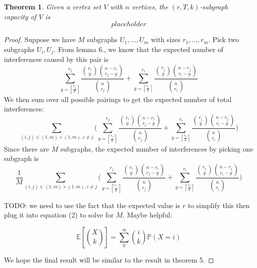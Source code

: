 \documentclass[10pt]{extarticle}
\newcommand{\E}{\mathbb{E}}
\newtheorem{theorem}{Theorem}
\theoremstyle{definition}
\begin{document}
\begin{theorem}
    Given a vertex set $V$ with $n$ vertices, the $(r,T,k)$-subgraph capacity of $V$ is 
    \begin{equation*}
        placeholder
    \end{equation*}
\end{theorem}

\begin{proof}
    Suppose we have $M$ subgraphs $U_1,...,U_m$ with sizes $r_1,...,r_m$. Pick two subgraphs $U_i,U_j$. From lemma 6., we know that the expected number of interferences caused by this pair is
    $$
    \sum_{y = \left\lceil \frac{r_j}{k} \right\rceil}^{r_j}  \frac{\binom{r_i}{y} \binom{n-r_i}{r_j-y}}{\binom{n}{r_j}} + \sum_{y = \left\lceil \frac{r_i}{k} \right\rceil}^{r_i}  \frac{\binom{r_j}{y} \binom{n-r_j}{r_i-y}}{\binom{n}{r_i}}
    $$
    We then sum over all possible pairings to get the expected number of total interferences:
    $$
    \sum_{(i,j) \in (1,m)\times(1,m), i \ne j} \Biggl( \sum_{y = \left\lceil \frac{r_j}{k} \right\rceil}^{r_j}  \frac{\binom{r_i}{y} \binom{n-r_i}{r_j-y}}{\binom{n}{r_j}} + \sum_{y = \left\lceil \frac{r_i}{k} \right\rceil}^{r_i}  \frac{\binom{r_j}{y} \binom{n-r_j}{r_i-y}}{\binom{n}{r_i}} \Biggr)
    $$
    Since there are $M$ subgraphs, the expected number of interferences by picking one subgraph is
    $$
    \frac{1}{M} \sum_{(i,j) \in (1,m)\times(1,m), i \ne j} \Biggl( \sum_{y = \left\lceil \frac{r_j}{k} \right\rceil}^{r_j}  \frac{\binom{r_i}{y} \binom{n-r_i}{r_j-y}}{\binom{n}{r_j}} + \sum_{y = \left\lceil \frac{r_i}{k} \right\rceil}^{r_i}  \frac{\binom{r_j}{y} \binom{n-r_j}{r_i-y}}{\binom{n}{r_i}} \Biggr)
    $$


    
    TODO: we need to use the fact that the expected value is $r$ to simplify this then plug it into equation (2) to solve for $M$. Maybe helpful:

    $$
    \E \left[ \binom{X}{k} \right] = \sum_{0}^{\infty} \binom{i}{k} \mathbb{P}(X=i)
    $$
    
    
    We hope the final result will be similar to the result in theorem 5. 

    
\end{proof}
\end{document}
